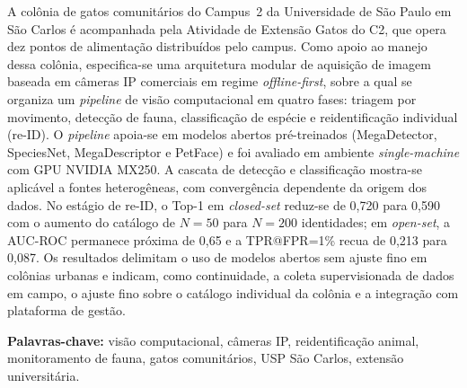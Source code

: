 
\begin{resumoumacoluna}
A colônia de gatos comunitários do Campus~2 da Universidade de São Paulo em São Carlos é acompanhada pela Atividade de Extensão Gatos do C2, que opera dez pontos de alimentação distribuídos pelo campus. Como apoio ao manejo dessa colônia, especifica-se uma arquitetura modular de aquisição de imagem baseada em câmeras IP comerciais em regime \textit{offline-first}, sobre a qual se organiza um \textit{pipeline} de visão computacional em quatro fases: triagem por movimento, detecção de fauna, classificação de espécie e reidentificação individual (re-ID). O \textit{pipeline} apoia-se em modelos abertos pré-treinados (MegaDetector, SpeciesNet, MegaDescriptor e PetFace) e foi avaliado em ambiente \textit{single-machine} com GPU NVIDIA MX250. A cascata de detecção e classificação mostra-se aplicável a fontes heterogêneas, com convergência dependente da origem dos dados. No estágio de re-ID, o Top-1 em \textit{closed-set} reduz-se de 0,720 para 0,590 com o aumento do catálogo de $N{=}50$ para $N{=}200$ identidades; em \textit{open-set}, a AUC-ROC permanece próxima de 0,65 e a TPR@FPR=1\% recua de 0,213 para 0,087. Os resultados delimitam o uso de modelos abertos sem ajuste fino em colônias urbanas e indicam, como continuidade, a coleta supervisionada de dados em campo, o ajuste fino sobre o catálogo individual da colônia e a integração com plataforma de gestão.

\vspace{\onelineskip}
\noindent
\textbf{Palavras-chave:} visão computacional, câmeras IP, reidentificação animal, monitoramento de fauna, gatos comunitários, USP São Carlos, extensão universitária.
\end{resumoumacoluna}

